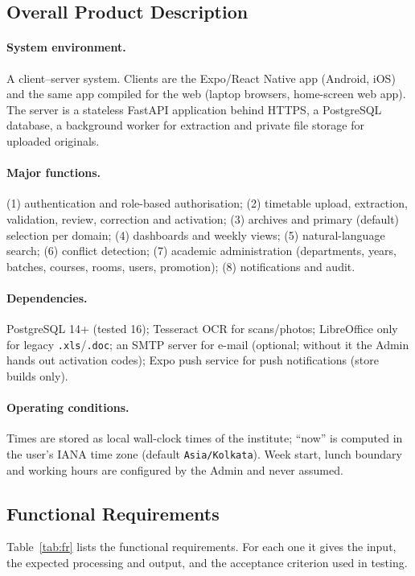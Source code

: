 \subsection{Overall Product Description}
\paragraph{System environment.}
A client--server system. Clients are the Expo/React Native app (Android, iOS) and the same app compiled
for the web (laptop browsers, home-screen web app). The server is a stateless FastAPI application
behind HTTPS, a PostgreSQL database, a background worker for extraction and private file storage for
uploaded originals.

\paragraph{Major functions.}
(1) authentication and role-based authorisation; (2) timetable upload, extraction, validation, review,
correction and activation; (3) archives and primary (default) selection per domain; (4) dashboards and
weekly views; (5) natural-language search; (6) conflict detection; (7) academic administration
(departments, years, batches, courses, rooms, users, promotion); (8) notifications and audit.

\paragraph{Dependencies.}
PostgreSQL 14+ (tested 16); Tesseract OCR for scans/photos; LibreOffice only for legacy
\texttt{.xls}/\texttt{.doc}; an SMTP server for e-mail (optional; without it the Admin hands out
activation codes); Expo push service for push notifications (store builds only).

\paragraph{Operating conditions.}
Times are stored as local wall-clock times of the institute; ``now'' is computed in the user's IANA
time zone (default \texttt{Asia/Kolkata}). Week start, lunch boundary and working hours are configured
by the Admin and never assumed.

\subsection{Functional Requirements}
Table~\ref{tab:fr} lists the functional requirements. For each one it gives the input, the expected
processing and output, and the acceptance criterion used in testing.

